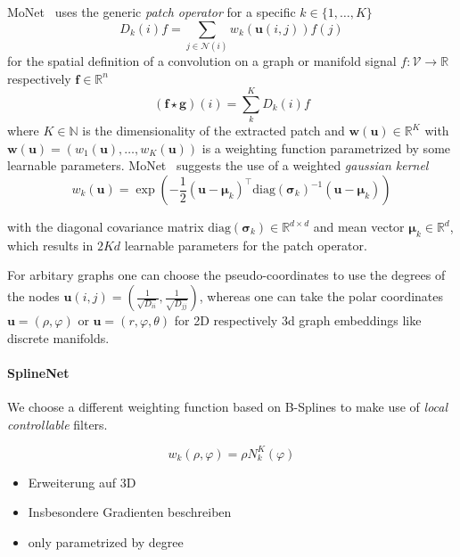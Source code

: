 \documentclass[pdftex,10pt,a4paper]{scrartcl}
\begin{document}
MoNet~\cite{Monti2016} uses the generic \emph{patch operator} for a specific $k \in \{ 1, \ldots, K \}$
\begin{equation*}
  D_k(i)f = \sum_{j \in \mathcal{N}(i)} w_k(\mathbf{u}(i, j)) f(j)
\end{equation*}
for the spatial definition of a convolution on a graph or manifold signal $f \colon \mathcal{V} \to \mathbb{R}$ respectively $\mathbf{f} \in \mathbb{R}^n$
\begin{equation*}
  (\mathbf{f} \star \mathbf{g})(i) = \sum_k^K D_k(i)f
\end{equation*}
where $K \in \mathbb{N}$ is the dimensionality of the extracted patch and $\mathbf{w}(\mathbf{u}) \in \mathbb{R}^K$ with $\mathbf{w}(\mathbf{u}) = (w_1(\mathbf{u}), \ldots, w_K(\mathbf{u}))$ is a weighting function parametrized by some learnable parameters.
MoNet~\cite{Monti2016} suggests the use of a weighted \emph{gaussian kernel}
\begin{equation*}
  w_k(\mathbf{u}) = \exp \left(-\frac{1}{2} {(\mathbf{u} - \boldsymbol{\mu}_k)}^{\top} {\mathrm{diag}(\boldsymbol{\sigma}_k)}^{-1} (\mathbf{u} - \boldsymbol{\mu}_k) \right)
\end{equation*}

with the diagonal covariance matrix $\mathrm{diag}(\boldsymbol{\sigma}_k) \in \mathbb{R}^{d \times d}$ and mean vector $\boldsymbol{\mu}_k \in \mathbb{R}^d$, which results in $2Kd$ learnable parameters for the patch operator.

For arbitary graphs one can choose the pseudo-coordinates to use the degrees of the nodes $\mathbf{u}(i,j) = \left( \tfrac{1}{\sqrt{D_{ii}}}, \tfrac{1}{\sqrt{D_{jj}}} \right)$, whereas one can take the polar coordinates $\mathbf{u} = (\rho, \varphi)$ or $\mathbf{u} = (r, \varphi, \theta)$ for 2D respectively 3d graph embeddings like discrete manifolds.

\paragraph{SplineNet}

We choose a different weighting function based on B-Splines to make use of \emph{local controllable} filters.

\begin{equation*}
  w_k(\rho, \varphi) = \rho N_k^K(\varphi)
\end{equation*}





\begin{itemize}
  \item Erweiterung auf 3D
  \item Insbesondere Gradienten beschreiben
\end{itemize}

\begin{itemize}
  \item only parametrized by degree
\end{itemize}



\end{document}
